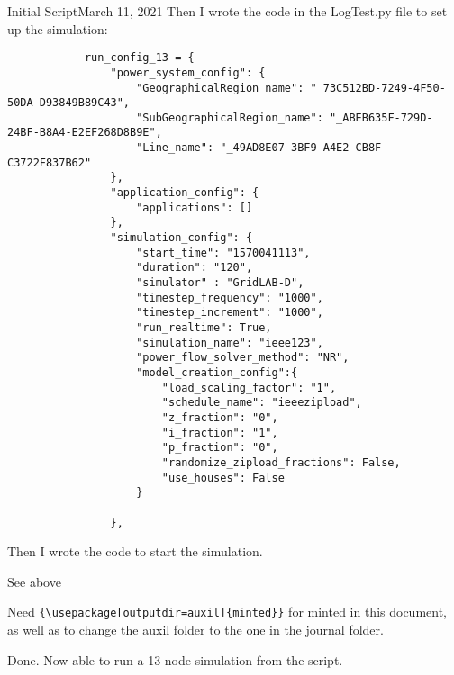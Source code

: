\begin{entry}{Initial Script}{March 11, 2021}
        Then I wrote the code in the LogTest.py file to set up the simulation:
        \begin{verbatim}
            run_config_13 = {
                "power_system_config": {
                    "GeographicalRegion_name": "_73C512BD-7249-4F50-50DA-D93849B89C43",
                    "SubGeographicalRegion_name": "_ABEB635F-729D-24BF-B8A4-E2EF268D8B9E",
                    "Line_name": "_49AD8E07-3BF9-A4E2-CB8F-C3722F837B62"
                },
                "application_config": {
                    "applications": []
                },
                "simulation_config": {
                    "start_time": "1570041113",
                    "duration": "120",
                    "simulator" : "GridLAB-D",
                    "timestep_frequency": "1000",
                    "timestep_increment": "1000",
                    "run_realtime": True,
                    "simulation_name": "ieee123",
                    "power_flow_solver_method": "NR",
                    "model_creation_config":{
                        "load_scaling_factor": "1",
                        "schedule_name": "ieeezipload",
                        "z_fraction": "0",
                        "i_fraction": "1",
                        "p_fraction": "0",
                        "randomize_zipload_fractions": False,
                        "use_houses": False
                    }

                },
        \end{verbatim}

        Then I wrote the code to start the simulation.

    \parameters

    See above

    \observations

        Need \verb"{\usepackage[outputdir=auxil]{minted}}" for minted in this document, as well as to change the auxil
        folder to the one in the journal folder.


    \results

    Done. Now able to run a 13-node simulation from the script.

\end{entry}